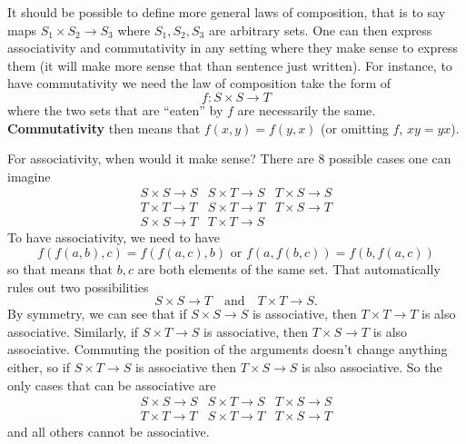 It should be possible to define more general laws of
composition, that is to say maps $S_{1}\times S_{2}\to
S_{3}$ where $S_1,S_2,S_3$ are arbitrary sets. One can then
express associativity and commutativity in any setting where
they make sense to express them (it will make more sense
that than sentence just written). For instance, to have
commutativity we need the law of composition take the form
of 
\begin{equation}
f: S\times S\to T
\end{equation}
where the two sets that are ``eaten'' by $f$ are necessarily
the same. \textbf{Commutativity} then
means that $f(x,y)=f(y,x)$ (or omitting $f$, $xy=yx$). 

For associativity, when would it make sense? There are 8 possible
cases one can imagine
\begin{equation*}
\begin{array}{ccc}
S\times S\to S & S\times T\to S & T\times S\to S\\
T\times T\to T & S\times T\to T & T\times S\to T\\
S\times S\to T & T\times T\to S & 
\end{array}
\end{equation*}
To have associativity, we need to have 
\begin{equation}
f(f(a,b),c) = f(f(a,c),b)\text{ or } f(a,f(b,c))=f(b,f(a,c))
\end{equation}
so that means that $b,c$ are both elements of the same
set. That automatically rules out two possibilities
\begin{equation*}
S\times S\to T\quad\text{and}\quad T\times T\to S.
\end{equation*}
By symmetry, we can see that if $S\times S\to S$ is
associative, then $T\times T\to T$ is also
associative. Similarly, if $S\times T\to S$ is associative,
then $T\times S\to T$ is also associative. Commuting the
position of the arguments doesn't change anything either, so
if $S\times T\to S$ is associative then $T\times S\to S$ is
also associative. So the only cases that can be associative
are
\begin{equation}
\begin{array}{ccc}
S\times S\to S & S\times T\to S & T\times S\to S\\
T\times T\to T & S\times T\to T & T\times S\to T
\end{array}
\end{equation}
and all others cannot be associative.

